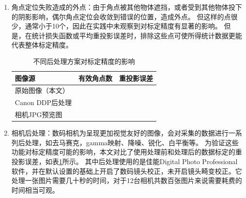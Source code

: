 \begin{enumerate}
\item 角点定位失败造成的外点：由于角点被其他物体遮挡，或者受到其他物体投下的阴影影响，偶尔角点定位会收敛到错误的位置，造成外点。
但这样的点很少，通常小于10个，因此在实践中未观察到对标定精度有显著的影响。
但是，在统计损失函数或平均重投影误差时，排除这些点可使所得统计数据更能代表整体标定精度。

\begin{table}[htb]
    \centering
    \begin{tabular}{l|rr}
        \toprule
        图像源 & 有效角点数 & 重投影误差 \\
        \midrule
        原始图像（本文）  &  &  \\
        Canon DDP后处理 &  &  \\
        相机JPG预览图    &  &  \\
        \bottomrule
    \end{tabular}
    \caption{不同后处理方案对标定精度的影响}
    \label{tab:camera_postprocess}
\end{table}

\item 相机后处理：数码相机为呈现更加视觉友好的图像，会对采集的数据进行一系列后处理，如去马赛克，gamma映射、降噪、锐化、白平衡等。
为验证这些功能对标定精度可能的影响，本文对比了使用处理前和处理后的数据标定的重投影误差，如表\ref{tab:camera_postprocess}所示。
其中后处理使用的是佳能Digital Photo Professional软件，并在默认设置的基础上开启了数码镜头校正，未开启镜头畸变校正。它处理一张图片需要几十秒的时间，对于12台相机共数百张图片来说需要耗费的时间相当可观。
\end{enumerate}
